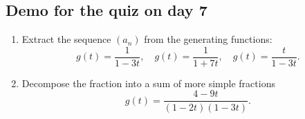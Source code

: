 \documentclass[12pt]{article}
\begin{document}
\subsection*{Demo for the quiz on day 7}

\begin{enumerate} 
    \item Extract the sequence $(a_n)$ from the generating functions:
    \[
    g(t) = \frac{1}{1 - 3t}, \quad g(t) = \frac{1}{1 + 7t}, \quad g(t) = \frac{t}{1 - 3t}.
    \]
    \item Decompose the fraction into a sum of more simple fractions
    \[
    g(t) = \frac{4 - 9t}{(1-2t)(1-3t)}.
    \]
\end{enumerate}
\end{document}
